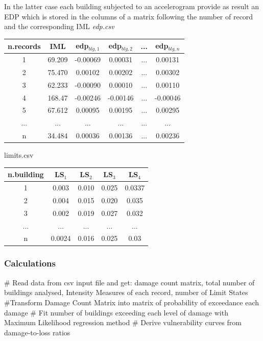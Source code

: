 In the latter case each building subjected to an accelerogram provide as result an EDP which is stored in the columns of a matrix following the number of record and the corresponding IML \textit{edp.csv}

\begin{table}[H]
\centering
\begin{tabular}{|c|c|c|c|c|c|} \hline
\textbf{n.records} & \textbf{IML} & \textbf{edp$_{blg,1}$} & \textbf{edp$_{blg,2}$} & \textbf{...} & \textbf{edp$_{blg,n}$} \\ \hline
1 &	69.209 &	-0.00069 &	0.00031 & ... &	0.00131\\ \hline
2 &	75.470 &	0.00102 & 	0.00202 & ... &	0.00302\\ \hline
3 &	62.233 &	-0.00090 &	0.00010 & ... &	0.00110\\ \hline
4 &	168.47 &	-0.00246 &	-0.00146 & ... &	-0.00046\\ \hline
5 &	67.612 &	0.00095 & 	0.00195 & ... &	0.00295\\ \hline
... & ... & ... & ... & ... & ...\\ \hline
n &	34.484 &	0.00036 & 	0.00136 & ... & 	0.00236\\ \hline
\end{tabular}
\end{table}

limits.csv
\begin{table}[H]
\centering
\begin{tabular}{|c|c|c|c|c|} \hline
\textbf{n.building} & \textbf{LS$_1$} & \textbf{LS$_2$} & \textbf{LS$_3$} & \textbf{LS$_4$} \\ \hline
1 & 0.003 &	0.010 &	0.025 &	0.0337\\ \hline
2 & 0.004 &	0.015 &	0.020 &	0.035\\ \hline
3 & 0.002 &	0.019 &	0.027 &	0.032\\ \hline
... & ... & ... & ... & ...\\ \hline
n & 0.0024 &	0.016 &	0.025 &	0.03\\ \hline
\end{tabular}
\end{table}

\subsubsection{Calculations}
# Read data from csv input file and get: damage count matrix, total number of buildings analysed, Intensity Measures of each record, number of Limit States
#Transform Damage Count Matrix into matrix of probability of exceedance each damage
# Fit number of buildings exceeding each level of damage with Maximum Likelihood regression method
# Derive vulnerability curves from damage-to-loss ratios

